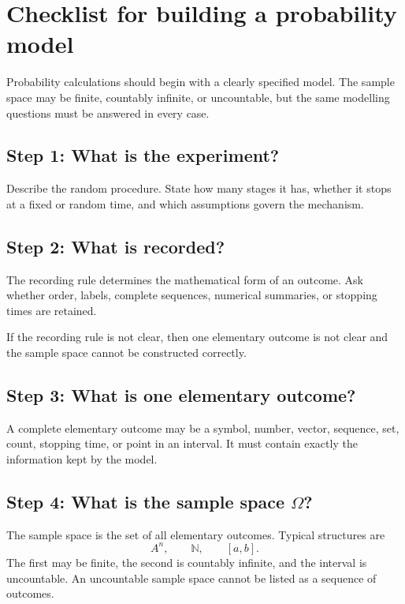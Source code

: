 \section{Checklist for building a probability model}

Probability calculations should begin with a clearly specified model. The sample
space may be finite, countably infinite, or uncountable, but the same modelling
questions must be answered in every case.

\subsection*{Step 1: What is the experiment?}

Describe the random procedure. State how many stages it has, whether it stops at
a fixed or random time, and which assumptions govern the mechanism.

\subsection*{Step 2: What is recorded?}

The recording rule determines the mathematical form of an outcome. Ask whether
order, labels, complete sequences, numerical summaries, or stopping times are
retained.

\begin{remarkbox}
If the recording rule is not clear, then one elementary outcome is not clear and
the sample space cannot be constructed correctly.
\end{remarkbox}

\subsection*{Step 3: What is one elementary outcome?}

A complete elementary outcome may be a symbol, number, vector, sequence, set,
count, stopping time, or point in an interval. It must contain exactly the
information kept by the model.

\subsection*{Step 4: What is the sample space \(\Omega\)?}

The sample space is the set of all elementary outcomes. Typical structures are
\[
A^n,
\qquad
\mathbb N,
\qquad
[a,b].
\]
The first may be finite, the second is countably infinite, and the interval is
uncountable. An uncountable sample space cannot be listed as a sequence of
outcomes.

